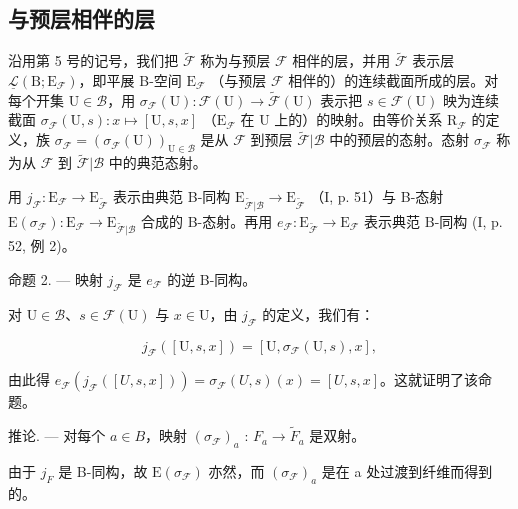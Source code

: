 \subsection{与预层相伴的层}

沿用第 5 号的记号，我们把 \(\widetilde{\mathcal{F}}\) 称为与预层 \(\mathcal{F}\) 相伴的层，并用 \(\widetilde{\mathcal{F}}\) 表示层 \(\underline{\mathcal{L}}(\mathrm{B};\mathrm{E}_{\mathcal{F}})\)，即平展 B-空间 \(\mathrm{E}_{\mathcal{F}}\) （与预层 \(\mathcal{F}\) 相伴的）的连续截面所成的层。对每个开集 \(\mathrm{U}\in\mathcal{B}\)，用 \(\sigma_{\mathcal{F}}(\mathrm{U})\colon\mathcal{F}(\mathrm{U})\to\widetilde{\mathcal{F}}(\mathrm{U})\) 表示把 \(s\in\mathcal{F}(\mathrm{U})\) 映为连续截面 \(\sigma_{\mathcal{F}}(\mathrm{U},s)\colon x\mapsto[\mathrm{U},s,x]\) （\(\mathrm{E}_{\mathcal{F}}\) 在 U 上的）的映射。由等价关系 \(\mathrm{R}_{\mathcal{F}}\) 的定义，族 \(\sigma_{\mathcal{F}}=(\sigma_{\mathcal{F}}(\mathrm{U}))_{\mathrm{U}\in\mathcal{B}}\) 是从 \(\mathcal{F}\) 到预层 \(\widetilde{\mathcal{F}}|\mathcal{B}\) 中的预层的态射。态射 \(\sigma_{\mathcal{F}}\) 称为从 \(\mathcal{F}\) 到 \(\widetilde{\mathcal{F}}|\mathcal{B}\) 中的典范态射。

用 \(j_{\mathcal{F}} \colon \mathrm{E}_{\mathcal{F}} \to \mathrm{E}_{\widetilde{\mathcal{F}}}\) 表示由典范 B-同构 \(\mathrm{E}_{\widetilde{\mathcal{F}}|\mathcal{B}} \to \mathrm{E}_{\widetilde{\mathcal{F}}}\) （I, p. 51）与 B-态射 \(\mathrm{E}(\sigma_{\mathcal{F}}) \colon \mathrm{E}_{\mathcal{F}} \to \mathrm{E}_{\widetilde{\mathcal{F}}|\mathcal{B}}\) 合成的 B-态射。再用 \(e_{\mathcal{F}} \colon \mathrm{E}_{\widetilde{\mathcal{F}}} \to \mathrm{E}_{\mathcal{F}}\) 表示典范 B-同构 (I, p. 52, 例 2)。

命题 2. --- 映射 \(j_{\mathcal{F}}\) 是 \(e_{\mathcal{F}}\) 的逆 B-同构。

对 \(\mathrm{U}\in \mathcal{B}\)、\(s\in \mathcal{F}(\mathrm{U})\) 与 \(x\in \mathrm{U}\)，由 \(j_{\mathcal{F}}\) 的定义，我们有：

\[
j _ {\mathcal {F}} ([ \mathrm{U}, s, x ]) = [ \mathrm{U}, \sigma_ {\mathcal {F}} (\mathrm{U}, s), x ],
\]

由此得 \(e_{\mathcal{F}}(j_{\mathcal{F}}([U,s,x])) = \sigma_{\mathcal{F}}(U,s)(x) = [U,s,x]\)。这就证明了该命题。

推论. --- 对每个 \(a \in B\)，映射 \((\sigma_{\mathcal{F}})_{a}\) : \(F_{a} \to \widetilde{F}_{a}\) 是双射。

由于 \(j_{F}\) 是 B-同构，故 \(\mathrm{E}(\sigma_{\mathcal{F}})\) 亦然，而 \((\sigma_{\mathcal{F}})_{a}\) 是在 a 处过渡到纤维而得到的。

